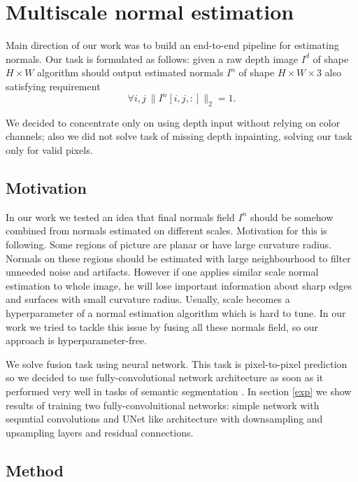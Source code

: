 \chapter{Multiscale normal estimation} \label{method}

Main direction of our work was to build an end-to-end pipeline for estimating normals. Our task is formulated as follows: given a raw depth image $I^d$ of shape $H \times W$ algorithm should output estimated normals $I^n$ of shape $H \times W \times 3$ also satisfying requirement 
\begin{equation}
\forall i,j\ \|I^n\left[i, j, :\right]\|_2 = 1. \label{eq:1}
\end{equation}

We decided to concentrate only on using depth input without relying on color channels; also we did not solve task of missing depth inpainting, solving our task only for valid pixels.

\section{Motivation}

In our work we tested an idea that final normals field $I^n$ should be somehow combined from normals estimated on different scales. Motivation for this is following. Some regions of picture are planar or have large curvature radius. Normals on these regions should be estimated with large neighbourhood to filter unneeded noise and artifacts. However if one applies similar scale normal estimation to whole image, he will lose important information about sharp edges and surfaces with small curvature radius. Usually, scale becomes a hyperparameter of a normal estimation algorithm which is hard to tune. In our work we tried to tackle this issue by fusing all these normals field, so our approach is hyperparameter-free.

We solve fusion task using neural network. This task is pixel-to-pixel prediction so we decided to use fully-convolutional network architecture as soon as it performed very well in tasks of semantic segmentation \cite{fcn}. In section \ref{exp} we show results of training two fully-convoluitional networks: simple network with sequntial convolutions and UNet \cite{unet} like architecture with downsampling and upsampling layers and residual connections.

\section{Method} \label{method}

